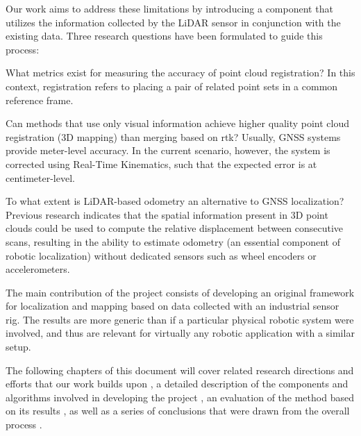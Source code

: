 Our work aims to address these limitations by introducing a component that utilizes the information collected by the LiDAR sensor in conjunction with the existing data. Three research questions have been formulated to guide this process:

\begin{compactenum}
    \item What metrics exist for measuring the accuracy of point cloud \gls{registration}? In this context, registration refers to placing a pair of related point sets in a common reference frame.

    \item Can methods that use only visual information achieve higher quality point cloud registration (3D mapping) than merging based on \acrfull{rtk}? Usually, GNSS systems provide meter-level accuracy. In the current scenario, however, the system is corrected using Real-Time Kinematics, such that the expected error is at centimeter-level.

    \item To what extent is LiDAR-based \gls{odometry} an alternative to GNSS localization? Previous research indicates that the spatial information present in 3D point clouds could be used to compute the relative displacement between consecutive scans, resulting in the ability to estimate odometry (an essential component of robotic localization) without dedicated sensors such as wheel encoders or accelerometers.
\end{compactenum}

The main contribution of the project consists of developing an original framework for localization and mapping based on data collected with an industrial sensor rig. The results are more generic than if a particular physical robotic system were involved, and thus are relevant for virtually any robotic application with a similar setup.

The following chapters of this document will cover related research directions and efforts that our work builds upon , a detailed description of the components and algorithms involved in developing the project , an evaluation of the method based on its results , as well as a series of conclusions that were drawn from the overall process .


